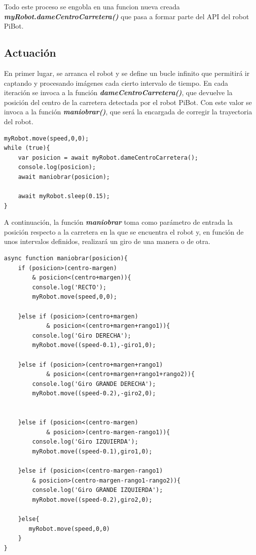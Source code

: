 \documentclass{report}
\begin{document}
Todo este proceso se engobla en una funcion nueva creada \textit{\textbf{myRobot.dameCentroCarretera()}} que pasa a formar parte del API del robot PiBot.

\subsection{Actuación}

En primer lugar, se arranca el robot y se define un bucle infinito que permitirá ir captando y procesando imágenes cada cierto intervalo de tiempo. En cada iteración se invoca a la función \textit{\textbf{dameCentroCarretera()}}, que devuelve la posición del centro de la carretera detectada por el robot PiBot. Con este valor se invoca a la función \textit{\textbf{maniobrar()}}, que será la encargada de corregir la trayectoria del robot.

\begin{lstlisting}[backgroundcolor = \color{light-gray},
				   aboveskip = 2em,
				   belowskip = 2em,
                   xleftmargin = 2cm,
                   framexleftmargin = 1em,
                   basicstyle=\small]
myRobot.move(speed,0,0);                   
while (true){
	var posicion = await myRobot.dameCentroCarretera();
	console.log(posicion);
	await maniobrar(posicion);

	await myRobot.sleep(0.15);
}
\end{lstlisting}

A continuación, la función \textit{\textbf{maniobrar}} toma como parámetro de entrada la posición respecto a la carretera en la que se encuentra el robot y, en función de unos intervalos definidos, realizará un giro de una manera o de otra.

\newpage
\begin{lstlisting}[backgroundcolor = \color{light-gray},
				   aboveskip = 2em,
				   belowskip = 2em,
                   xleftmargin = 2cm,
                   framexleftmargin = 1em,
                   basicstyle=\small]
async function maniobrar(posicion){
    if (posicion>(centro-margen) 
    	& posicion<(centro+margen)){
        console.log('RECTO');
        myRobot.move(speed,0,0);

    }else if (posicion>(centro+margen) 
    		& posicion<(centro+margen+rango1)){
        console.log('Giro DERECHA');
        myRobot.move((speed-0.1),-giro1,0);

    }else if (posicion>(centro+margen+rango1) 
    		& posicion<(centro+margen+rango1+rango2)){
        console.log('Giro GRANDE DERECHA');
        myRobot.move((speed-0.2),-giro2,0);


    }else if (posicion<(centro-margen) 
    		& posicion>(centro-margen-rango1)){
        console.log('Giro IZQUIERDA');
        myRobot.move((speed-0.1),giro1,0);

    }else if (posicion<(centro-margen-rango1) 
    	& posicion>(centro-margen-rango1-rango2)){
        console.log('Giro GRANDE IZQUIERDA');
        myRobot.move((speed-0.2),giro2,0);

    }else{
       myRobot.move(speed,0,0)
    }
}
\end{lstlisting}
\end{document}
